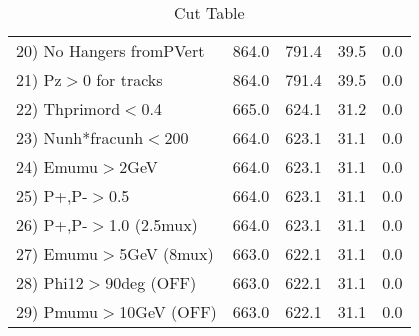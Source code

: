 \begin{table}[h!]
\begin{tabular}{||l||r|r|r|r||}
 20) No Hangers fromPVert &       864.0 &       791.4 &        39.5 &         0.0 \\
 21) Pz$>$0 for tracks    &       864.0 &       791.4 &        39.5 &         0.0 \\
 22) Thprimord$<$0.4      &       665.0 &       624.1 &        31.2 &         0.0 \\
 23) Nunh*fracunh$<$200   &       664.0 &       623.1 &        31.1 &         0.0 \\
 24) Emumu$>$2GeV         &       664.0 &       623.1 &        31.1 &         0.0 \\
 25) P+,P-$>$0.5          &       664.0 &       623.1 &        31.1 &         0.0 \\
 26) P+,P-$>$1.0 (2.5mux) &       664.0 &       623.1 &        31.1 &         0.0 \\
 27) Emumu$>$5GeV  (8mux) &       663.0 &       622.1 &        31.1 &         0.0 \\
 28) Phi12$>$90deg  (OFF) &       663.0 &       622.1 &        31.1 &         0.0 \\
 29) Pmumu$>$10GeV  (OFF) &       663.0 &       622.1 &        31.1 &         0.0 \\
 \hline
 \hline
 \end{tabular}
 \caption{Cut Table \cohrp  }
 \label{tab-cut_crhop}
 \end{table}
